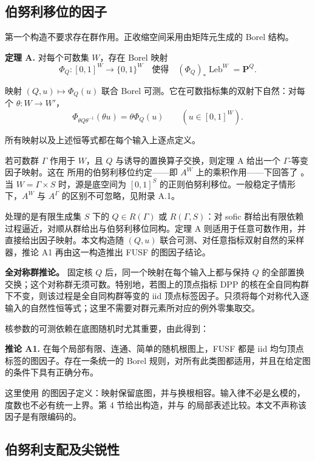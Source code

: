 \documentclass[UTF8,zihao=-4,a4paper]{ctexart}
\numberwithin{equation}{section}
\begin{document}
\subsection{伯努利移位的因子}

第一个构造不要求存在群作用。正收缩空间采用由矩阵元生成的 Borel 结构。

\textbf{定理 A.} 对每个可数集 \(W\)，存在 Borel 映射
\[
 \Phi_Q:[0,1]^W\longrightarrow\{0,1\}^W
 \quad\text{使得}\quad
 (\Phi_Q)_*\operatorname{Leb}^W=\mathbf P^Q.
\]

映射 \((Q,u)\mapsto\Phi_Q(u)\) 联合 Borel 可测。它在可数指标集的双射下自然：对每个 \(\theta:W\to W'\)，
\[
 \Phi_{\theta Q\theta^{-1}}(\theta u)=\theta\Phi_Q(u)
 \qquad(u\in[0,1]^W).
\]

所有映射以及上述恒等式都在每个输入上逐点定义。

若可数群 \(\Gamma\) 作用于 \(W\)，且 \(Q\) 与诱导的置换算子交换，则定理 A 给出一个 \(\Gamma\)-等变因子映射。这在 \cite{LT} 所用的伯努利移位约定------即 \(A^W\) 上的乘积作用------下回答了 \cite[Question 7.7]{LT}。当 \(W=\Gamma\times S\) 时，源是底空间为 \([0,1]^S\) 的正则伯努利移位。一般稳定子情形下，\(A^W\) 与 \(A^\Gamma\) 的区别不可忽略，见附录 A.1。

\cite[Theorem 7.3 and Corollary 7.4]{LT} 处理的是有限生成集 \(S\) 下的 \(Q\in R(\Gamma)\) 或 \(R(\Gamma,S)\)：对 sofic 群给出有限依赖过程逼近，对顺从群给出与伯努利移位同构。定理 A 则适用于任意可数作用，并直接给出因子映射。本文构造随 \((Q,u)\) 联合可测、对任意指标双射自然的采样器，推论 A1 再由这一构造推出 FUSF 的图因子结论。

\textbf{全对称群推论。} 固定核 \(Q\) 后，同一个映射在每个输入上都与保持 \(Q\) 的全部置换交换；这个对称群无须可数。特别地，若图上的顶点指标 DPP 的核在全自同构群下不变，则该过程是全自同构群等变的 iid 顶点标签因子。只须将每个对称代入逐输入的自然性恒等式；这里不需要对群元素所对应的例外零集取交。

核参数的可测依赖在底图随机时尤其重要，由此得到：

\textbf{推论 A1.} 在每个局部有限、连通、简单的随机根图上，FUSF 都是 iid 均匀顶点标签的图因子。存在一条统一的 Borel 规则，对所有此类图都适用，并且在给定图的条件下具有正确分布。

这里使用 \cite[\S{}2.1]{ARS} 的图因子定义：映射保留底图，并与换根相容。输入律不必是幺模的，度数也不必有统一上界。第 4 节给出构造，并与 \cite[\S{}2]{Tim} 的局部表述比较。本文不声称该因子是有限编码的。

\subsection{伯努利支配及尖锐性}
\end{document}
